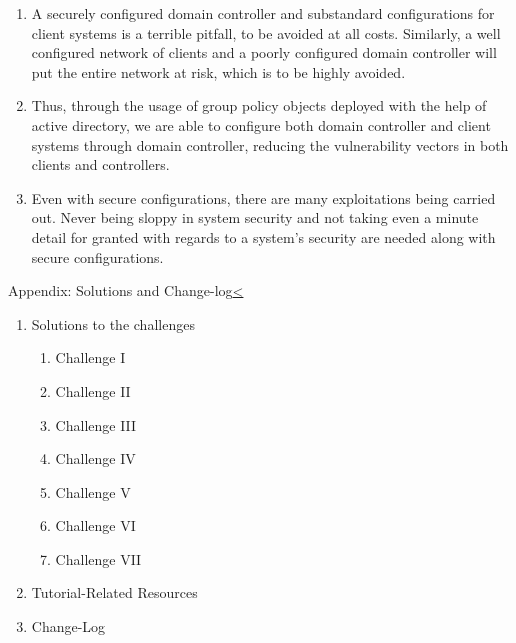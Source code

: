 \documentclass[12pt]{extarticle}
\newenvironment{instructionblock}{\Large\bgroup}{\egroup}
\newcommand{\ben}{\begin{enumerate}}
\newcommand{\een}{\end{enumerate}}
\begin{document}
\begin{enumerate}
	
\item A securely configured domain controller and substandard configurations for client systems is a terrible pitfall, to be avoided at all costs. Similarly, a well configured network of clients and a poorly configured domain controller will put the entire network at risk, which is to be highly avoided.

\item Thus, through the usage of group policy objects deployed with the help of active directory, we are able to configure both domain controller and client systems through domain controller, reducing the vulnerability vectors in both clients and controllers.

\item Even with secure configurations, there are many exploitations being carried out. Never being sloppy in system security and not taking even a minute detail for granted with regards to a system's security are needed along with secure configurations.

\end{enumerate}




\pagebreak
	
\noindent
\begin{slide}{Appendix: Solutions and Change-log}{\hyperref[slide 14]{\textless}}
\begin{instructionblock}
	\begin{enumerate}
		\item {Solutions to the challenges}
		{\small{\ben
			\item Challenge I
			\item Challenge II
			\item Challenge III
			\item Challenge IV
			\item Challenge V
			\item Challenge VI
			\item Challenge VII
		\een}}
		\item {Tutorial-Related Resources}
		\item {Change-Log}
	\end{enumerate}
	\end{instructionblock}
\end{slide}
	
\end{document}
